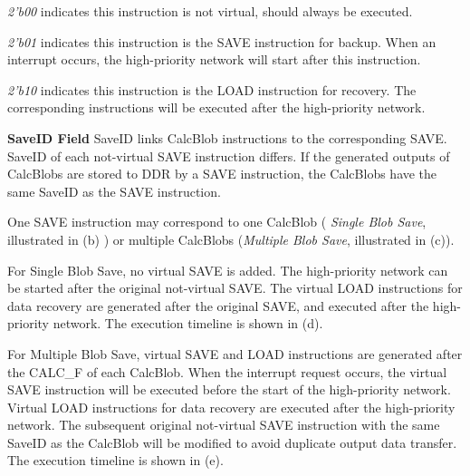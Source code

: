 	\textit{2'b00} indicates this instruction is not virtual, should always be executed.
	
	\textit{2'b01} indicates this instruction is the SAVE instruction for backup. When an interrupt occurs, the high-priority network will start after this instruction.
	
	\textit{2'b10} indicates this instruction is the LOAD instruction for recovery. The corresponding instructions will be executed after the high-priority network.

\textbf{ SaveID Field }
SaveID links CalcBlob instructions to the corresponding SAVE. SaveID of each not-virtual SAVE instruction differs. If the generated outputs of CalcBlobs are stored to DDR by a SAVE instruction, the CalcBlobs have the same SaveID as the SAVE instruction.

One SAVE instruction may correspond to one CalcBlob ( \textit{Single Blob Save}, illustrated in (b) ) or multiple CalcBlobs (\textit{Multiple Blob Save}, illustrated in (c)).

For Single Blob Save, no virtual SAVE is added. The high-priority network can be started after the original not-virtual SAVE. The virtual LOAD instructions for data recovery are generated after the original SAVE, and executed after the high-priority network. The execution timeline is shown in (d).

For Multiple Blob Save, virtual SAVE and LOAD instructions are generated after the CALC\_F of each CalcBlob. When the interrupt request occurs, the virtual SAVE instruction will be executed before the start of the high-priority network. Virtual LOAD instructions for data recovery are executed after the high-priority network. The subsequent original not-virtual SAVE instruction with the same SaveID as the CalcBlob will be modified to avoid duplicate output data transfer. The execution timeline is shown in (e).


